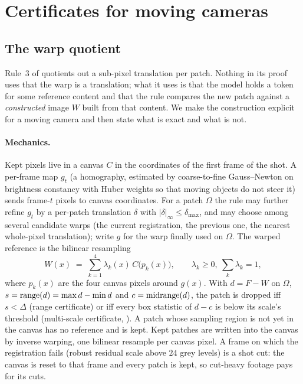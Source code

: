 \section{Certificates for moving cameras}
\label{sec:theory}

\subsection{The warp quotient}

Rule~3 of \citet{nair2026certifiedskip} quotients out a sub-pixel translation per patch. Nothing in its proof uses that the warp is a translation; what it uses is that the model holds a token for some reference content and that the rule compares the new patch against a \emph{constructed} image $W$ built from that content. We make the construction explicit for a moving camera and then state what is exact and what is not.

\paragraph{Mechanics.} Kept pixels live in a canvas $C$ in the coordinates of the first frame of the shot. A per-frame map $g_t$ (a homography, estimated by coarse-to-fine Gauss--Newton on brightness constancy with Huber weights so that moving objects do not steer it) sends frame-$t$ pixels to canvas coordinates. For a patch $\Omega$ the rule may further refine $g_t$ by a per-patch translation $\delta$ with $|\delta|_\infty \le \delta_{\max}$, and may choose among several candidate warps (the current registration, the previous one, the nearest whole-pixel translation); write $g$ for the warp finally used on $\Omega$. The warped reference is the bilinear resampling
\begin{equation}
W(x) \;=\; \sum_{k=1}^{4} \lambda_k(x)\, C\big(p_k(x)\big), \qquad \lambda_k \ge 0,\ \textstyle\sum_k \lambda_k = 1,
\label{eq:W}
\end{equation}
where $p_k(x)$ are the four canvas pixels around $g(x)$. With $d = F - W$ on $\Omega$, $s = \operatorname{range}(d) = \max d - \min d$ and $c = \operatorname{midrange}(d)$, the patch is dropped iff $s < \Delta$ (range certificate) or iff every box statistic of $d - c$ is below its scale's threshold (multi-scale certificate, \citealp[Rule 2]{nair2026certifiedskip}). A patch whose sampling region is not yet in the canvas has no reference and is kept. Kept patches are written into the canvas by inverse warping, one bilinear resample per canvas pixel. A frame on which the registration fails (robust residual scale above $24$ grey levels) is a shot cut: the canvas is reset to that frame and every patch is kept, so cut-heavy footage pays for its cuts.

